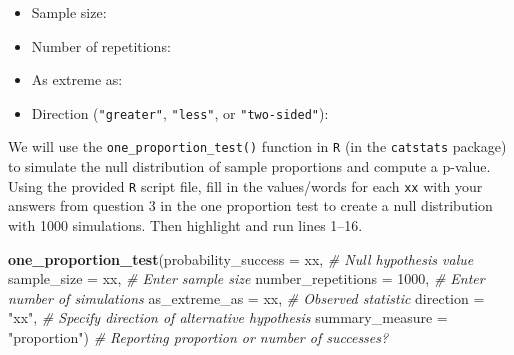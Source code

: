 \documentclass[
]{report}
\newenvironment{Shaded}{\begin{snugshade}}{\end{snugshade}}
\newcommand{\AttributeTok}[1]{\textcolor[rgb]{0.13,0.29,0.53}{#1}}
\newcommand{\CommentTok}[1]{\textcolor[rgb]{0.56,0.35,0.01}{\textit{#1}}}
\newcommand{\DecValTok}[1]{\textcolor[rgb]{0.00,0.00,0.81}{#1}}
\newcommand{\FunctionTok}[1]{\textcolor[rgb]{0.13,0.29,0.53}{\textbf{#1}}}
\newcommand{\NormalTok}[1]{#1}
\newcommand{\StringTok}[1]{\textcolor[rgb]{0.31,0.60,0.02}{#1}}
\providecommand{\tightlist}{%
  \setlength{\itemsep}{0pt}\setlength{\parskip}{0pt}}
\begin{document}
\begin{itemize}
\tightlist
\item
  Sample size:
\end{itemize}

\vspace{.2in}

\begin{itemize}
\tightlist
\item
  Number of repetitions:
\end{itemize}

\vspace{.2in}

\begin{itemize}
\tightlist
\item
  As extreme as:
\end{itemize}

\vspace{.2in}

\begin{itemize}
\tightlist
\item
  Direction (\texttt{"greater"}, \texttt{"less"}, or \texttt{"two-sided"}):
\end{itemize}

We will use the \texttt{one\_proportion\_test()} function in \texttt{R} (in the \texttt{catstats} package) to simulate the null distribution of sample proportions and compute a p-value. Using the provided \texttt{R} script file, fill in the values/words for each \texttt{xx} with your answers from question 3 in the one proportion test to create a null distribution with 1000 simulations. Then highlight and run lines 1--16.

\begin{Shaded}
\begin{Highlighting}[]
\FunctionTok{one\_proportion\_test}\NormalTok{(}\AttributeTok{probability\_success =}\NormalTok{ xx, }\CommentTok{\# Null hypothesis value}
          \AttributeTok{sample\_size =}\NormalTok{ xx, }\CommentTok{\# Enter sample size}
          \AttributeTok{number\_repetitions =} \DecValTok{1000}\NormalTok{, }\CommentTok{\# Enter number of simulations}
          \AttributeTok{as\_extreme\_as =}\NormalTok{ xx, }\CommentTok{\# Observed statistic}
          \AttributeTok{direction =} \StringTok{"xx"}\NormalTok{, }\CommentTok{\# Specify direction of alternative hypothesis}
          \AttributeTok{summary\_measure =} \StringTok{"proportion"}\NormalTok{) }\CommentTok{\# Reporting proportion or number of successes?}
\end{Highlighting}
\end{Shaded}
\end{document}
